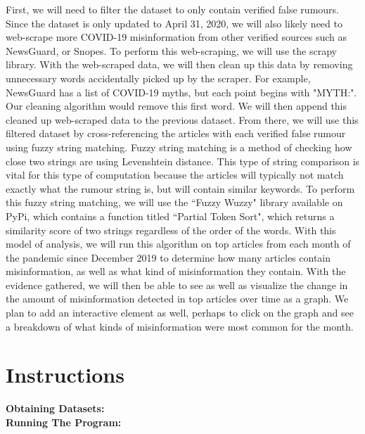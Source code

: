 \documentclass[fontsize=11pt]{article}
\begin{document}
    First, we will need to filter the dataset to only contain verified false rumours. Since the dataset is only updated to April 31, 2020, we will also likely need to web-scrape more COVID-19 misinformation from other verified sources such as NewsGuard, or Snopes. To perform this web-scraping, we will use the scrapy library. With the web-scraped data, we will then clean up this data by removing unnecessary words accidentally picked up by the scraper. For example, NewsGuard has a list of COVID-19 myths, but each point begins with "MYTH:". Our cleaning algorithm would remove this first word. We will then append this cleaned up web-scraped data to the previous dataset. From there, we will use this filtered dataset by cross-referencing the articles with each verified false rumour using fuzzy string matching. Fuzzy string matching is a method of checking how close two strings are using Levenshtein distance. This type of string comparison is vital for this type of computation because the articles will typically not match exactly what the rumour string is, but will contain similar keywords. To perform this fuzzy string matching, we will use the ``Fuzzy Wuzzy" library available on PyPi, which contains a function titled ``Partial Token Sort", which returns a similarity score of two strings regardless of the order of the words. With this model of analysis, we will run this algorithm on top articles from each month of the pandemic since December 2019 to determine how many articles contain misinformation, as well as what kind of misinformation they contain. With the evidence gathered, we will then be able to see as well as visualize the change in the amount of misinformation detected in top articles over time as a graph. We plan to add an interactive element as well, perhaps to click on the graph and see a breakdown of what kinds of misinformation were most common for the month.


    \section*{Instructions}

    \begin{flushleft}

        \textbf{Obtaining Datasets:}\\


        \textbf{Running The Program:}


    \end{flushleft}
\end{document}
